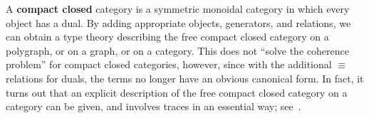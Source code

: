 \begin{rmk}
  A \textbf{compact closed} category is a symmetric monoidal category in which every object has a dual.
  By adding appropriate objects, generators, and relations, we can obtain a type theory describing the free compact closed category on a polygraph, or on a graph, or on a category.
  This does not ``solve the coherence problem'' for compact closed categories, however, since with the additional $\equiv$ relations for duals, the terms no longer have an obvious canonical form.
  In fact, it turns out that an explicit description of the free compact closed category on a category can be given, and involves traces in an essential way; see~\cite{kl:cpt}.
\end{rmk}


